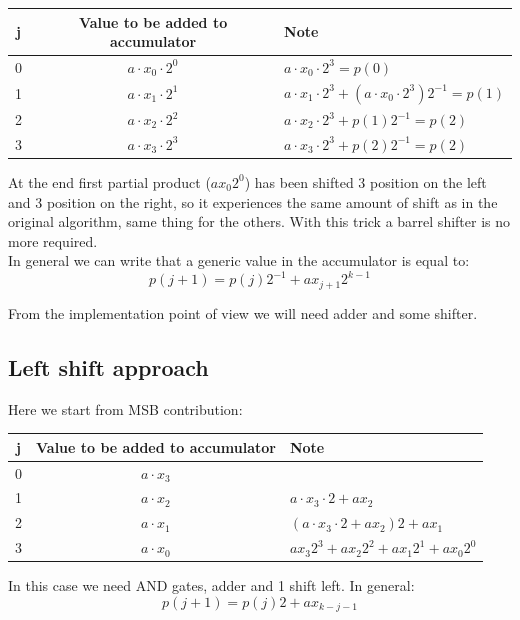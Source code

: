 \begin{center}
  \begin{tabular}{|c|c|l|}
    \hline
    j&  Value to be added to accumulator& Note\\
    \hline
    0&    $a \cdot x_0 \cdot 2^0$& $a \cdot x_0 \cdot 2^3 =p(0) $ \\
    1&    $a \cdot x_1 \cdot 2^1$& $a \cdot x_1 \cdot 2^3 + (a \cdot x_0 \cdot 2^3) 2^{-1} =p(1) $  \\
    2&    $a \cdot x_2 \cdot 2^2$& $a \cdot x_2 \cdot 2^3 + p(1) 2^{-1} =p(2) $\\
    3&    $a \cdot x_3 \cdot 2^3$& $a \cdot x_3 \cdot 2^3 + p(2) 2^{-1} =p(2) $\\
    \hline
  \end{tabular}
\end{center}

At the end first partial product ($a x_0 2^0$) has been shifted 3 position on the left and 3 position on the right, so it experiences the same amount of shift as in the original algorithm, same thing for the others. With this trick a barrel shifter is no more required.\\

In general we can write that a generic value in the accumulator is equal to:
   $$p(j+1)=p(j)2^{-1}+ax_{j+1} 2^{k-1}$$

From the implementation point of view we will need adder and some shifter.

\subsection{Left shift approach}
Here we start from MSB contribution:

\begin{center}
  \begin{tabular}{|c|c|l|}
    \hline
    j&  Value to be added to accumulator& Note\\
    \hline
    0&    $a \cdot x_3$& \\
    1&    $a \cdot x_2$& $a \cdot x_3 \cdot 2 + a x_2$  \\
    2&    $a \cdot x_1$& $(a \cdot x_3 \cdot 2 + a x_2) 2 + a x_1$\\
    3&    $a \cdot x_0$& $a x_3 2^3 + a x_2 2^2 + a x_1 2^1+a x_0 2^0$\\
    \hline
  \end{tabular}
\end{center}

In this case we need AND gates, adder and 1 shift left. In general:
$$p(j+1)=p(j)2+ax_{k-j-1}$$

